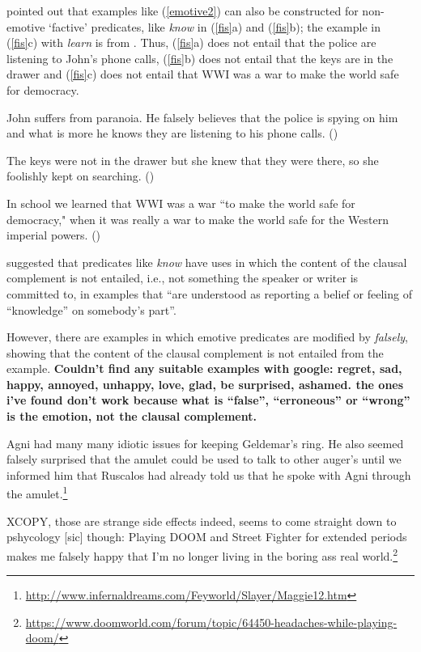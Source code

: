 \documentclass[11pt,fleqn]{article}
\newcommand{\6}{\mbox{$[\hspace*{-.6mm}[$}}
\newcommand{\9}{\mbox{$]\hspace*{-.6mm}]$}}
\begin{document}
\citet[514]{abrusan2011} pointed out that examples like (\ref{emotive2})  can also be constructed for non-emotive `factive' predicates, like {\em know} in (\ref{fis}a) and (\ref{fis}b); the example in (\ref{fis}c) with {\em learn} is from \citealt{hazlett2010}. Thus, (\ref{fis}a) does not entail that the police are listening to John's phone calls, (\ref{fis}b) does not entail that the keys are in the drawer and (\ref{fis}c) does not entail that WWI was a war to make the world safe for democracy.

\begin{exe}
\ex\label{fis}
\begin{xlist}

\ex John suffers from paranoia. He falsely believes that the police is spying on him and what is more he knows they are listening to his phone calls. \hfill (\citealt[514]{abrusan2011})

\ex The keys were not in the drawer but she knew that they were there, so she foolishly kept on searching. \hfill (\citealt[514]{abrusan2011})

\ex In school we learned that WWI was a war ``to make the world safe for democracy," when it was really a war to make the world safe for the Western imperial powers. \hfill (\citealt[501]{hazlett2010})

\end{xlist}

\end{exe}
\citet[515]{abrusan2011} suggested that predicates like {\em know} have uses in which the content of the clausal complement is not entailed, i.e., not something the speaker or writer is committed to, in examples that ``are understood as reporting a belief or feeling of ``knowledge'' on somebody's part''. 

However, there are examples in which emotive predicates are modified by {\em falsely}, showing that the content of the clausal complement is not entailed from the example. {\bf Couldn't find any suitable examples with google: regret, sad, happy, annoyed, unhappy, love, glad, be surprised, ashamed. the ones i've found don't work because what is ``false'', ``erroneous'' or ``wrong'' is the emotion, not the clausal complement.}

\begin{exe}
\ex\label{falsely}
\begin{xlist}
\ex Agni had many many idiotic issues for keeping Geldemar's ring. He also seemed falsely surprised that the amulet could be used to talk to other auger's until we informed him that Ruscalos had already told us that he spoke with Agni through the amulet.\footnote{\url{http://www.infernaldreams.com/Feyworld/Slayer/Maggie12.htm}}

\ex XCOPY, those are strange side effects indeed, seems to come straight down to pshycology [sic] though: Playing DOOM and Street Fighter for extended periods makes me falsely happy that I'm no longer living in the boring ass real world.\footnote{\url{https://www.doomworld.com/forum/topic/64450-headaches-while-playing-doom/}}
\end{xlist}
\end{exe}
\end{document}
